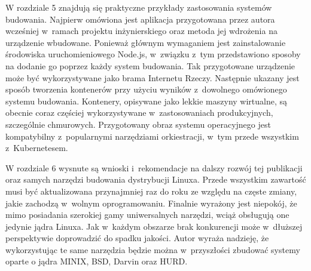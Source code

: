 \documentclass[printmode]{mgr}
\begin{document}
W rozdziale 5 znajdują się praktyczne przykłady zastosowania systemów budowania.
Najpierw omówiona jest aplikacja przygotowana przez autora wcześniej w~ramach projektu inżynierskiego oraz metoda jej wdrożenia na urządzenie wbudowane.
Ponieważ głównym wymaganiem jest zainstalowanie środowiska uruchomieniowego Node.js, w~związku z~tym przedstawiono sposoby na dodanie go poprzez każdy system budowania.
Tak przygotowane urządzenie może być wykorzystywane jako brama Internetu Rzeczy.
Następnie ukazany jest sposób tworzenia kontenerów przy użyciu wyników z~dowolnego omówionego systemu budowania.
Kontenery, opisywane jako lekkie maszyny wirtualne, są obecnie coraz częściej wykorzystywane w~zastosowaniach produkcyjnych, szczególnie chmurowych.
Przygotowany obraz systemu operacyjnego jest kompatybilny z~popularnymi narzędziami orkiestracji, w~tym przede wszystkim z~Kubernetesem.

W rozdziale 6 wysnute są wnioski i~rekomendacje na dalszy rozwój tej publikacji oraz samych narzędzi budowania dystrybucji Linuxa.
Przede wszystkim zawartość musi być aktualizowana przynajmniej raz do roku ze względu na częste zmiany, jakie zachodzą w~wolnym oprogramowaniu.
Finalnie wyrażony jest niepokój, że mimo posiadania szerokiej gamy uniwersalnych narzędzi, wciąż obsługują one jedynie jądra Linuxa.
Jak w~każdym obszarze brak konkurencji może w~dłuższej perspektywie doprowadzić do spadku jakości.
Autor wyraża nadzieję, że wykorzystując te same narzędzia będzie można w~przyszłości zbudować systemy oparte o jądra MINIX, BSD, Darvin oraz HURD.
\end{document}
